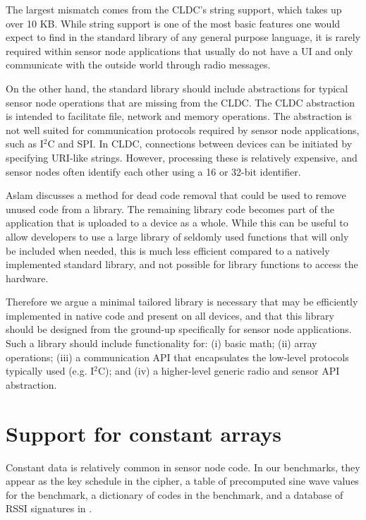 The largest mismatch comes from the CLDC's string support, which takes up over 10 KB. While string support is one of the most basic features one would expect to find in the standard library of any general purpose language, it is rarely required within sensor node applications that usually do not have a UI and only communicate with the outside world through radio messages.

On the other hand, the standard library should include abstractions for typical sensor node operations that are missing from the CLDC. The CLDC  abstraction is intended to facilitate file, network and memory operations. The abstraction is not well suited for communication protocols required by sensor node applications, such as I$^{2}$C and SPI. In CLDC, connections between devices can be initiated by specifying URI-like strings. However, processing these is relatively expensive, and sensor nodes often identify each other using a 16 or 32-bit identifier.

 

Aslam \cite{Aslam:2011thesis} discusses a method for dead code removal that could be used to remove unused code from a library. The remaining library code becomes part of the application that is uploaded to a device as a whole. While this can be useful to allow developers to use a large library of seldomly used functions that will only be included when needed, this is much less efficient compared to a natively implemented standard library, and not possible for library functions to access the hardware.

Therefore we argue a minimal tailored library is necessary that may be efficiently implemented in native code and present on all devices, and that this library should be designed from the ground-up specifically for sensor node applications. Such a library should include functionality for: (i) basic math; (ii) array operations; (iii) a communication API that encapsulates the low-level protocols typically used (e.g. I$^{2}$C); and (iv) a higher-level generic radio and sensor API abstraction.




\section{Support for constant arrays}
\label{sec-const-data}
Constant data is relatively common in sensor node code. In our benchmarks, they appear as the key schedule in the  cipher, a table of precomputed sine wave values for the  benchmark, a dictionary of codes in the  benchmark, and a database of RSSI signatures in .

